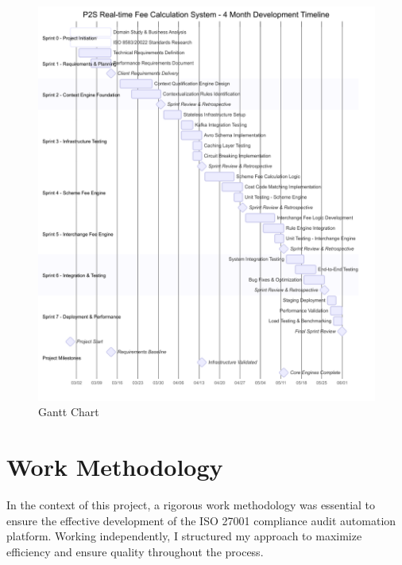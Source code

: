 \begin{figure}[H]
  \centering
    \includegraphics[width=\textwidth]{img/gantt.png}
  \caption{Gantt Chart}
  \label{Gantt Chart}      
\end{figure}

\section{Work Methodology}

In the context of this project, a rigorous work methodology was essential to ensure the effective development of the ISO 27001 compliance audit automation platform. Working independently, I structured my approach to maximize efficiency and ensure quality throughout the process.


